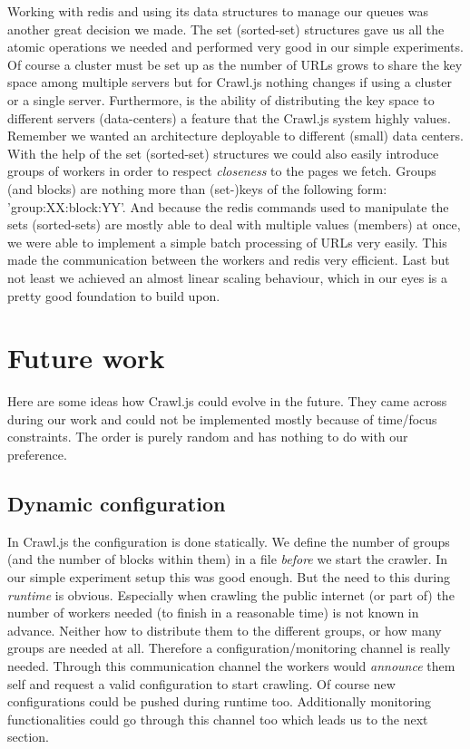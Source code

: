Working with redis and using its data structures to manage our queues was another great decision we made. The set (sorted-set) structures gave us all the atomic operations we needed and performed very good in our simple experiments. Of course a cluster must be set up as the number of URLs grows to share the key space among multiple servers but for Crawl.js nothing changes if using a cluster or a single server. Furthermore, is the ability of distributing the key space to different servers (data-centers) a feature that the Crawl.js system highly values. Remember we wanted an architecture deployable to different (small) data centers.
\newline
With the help of the set (sorted-set) structures we could also easily introduce groups of workers in order to respect \emph{closeness} to the pages we fetch. Groups (and blocks) are nothing more than (set-)keys of the following form: 'group:XX:block:YY'. And because the redis commands used to manipulate the sets (sorted-sets) are mostly able to deal with multiple values (members) at once, we were able to implement a simple batch processing of URLs very easily. This made the communication between the workers and redis very efficient.
\newline
Last but not least we achieved an almost linear scaling behaviour, which in our eyes is a pretty good foundation to build upon.

\section{Future work}
Here are some ideas how Crawl.js could evolve in the future. They came across during our work and could not be implemented mostly because of time/focus constraints. The order is purely random and has nothing to do with our preference.

\subsection{Dynamic configuration}
In Crawl.js the configuration is done statically. We define the number of groups (and the number of blocks within them) in a file \emph{before} we start the crawler. In our simple experiment setup this was good enough. But the need to this during \emph{runtime} is obvious. Especially when crawling the public internet (or part of) the number of workers needed (to finish in a reasonable time) is not known in advance. Neither how to distribute them to the different groups, or how many groups are needed at all. Therefore a configuration/monitoring channel is really needed. Through this communication channel the workers would \emph{announce} them self and request a valid configuration to start crawling. Of course new configurations could be pushed during runtime too. Additionally monitoring functionalities could go through this channel too which leads us to the next section. 

